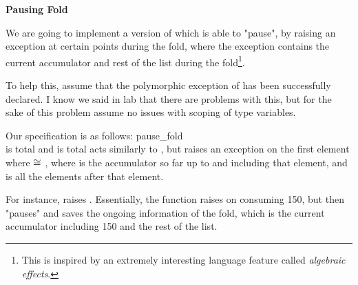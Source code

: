 \documentclass[addpoints,12pt]{exam}
\begin{document}
\begin{questions}

\newpage
{}

\textbf{Pausing Fold}

We are going to implement a version of  which
is able to "pause", by raising an exception at certain points
during the fold, where the exception contains the current accumulator and
rest of the list during the fold\footnote{This is inspired by an extremely
interesting language feature called \textit{algebraic effects}.}.

To help this, assume that the polymorphic exception of
 has been successfully declared.
I know we said in lab that there are problems with this, but for
the sake of this problem assume no issues with scoping of type variables.

Our specification is as follows:
\spec
  {pause_fold}
  {
   \vspace{4pt}
  \\
   {\small {}}}
  { is total and  is total}
  { acts similarly to ,
  but raises an exception  on the first element  where
   $\cong$ , where  is the accumulator so far up to
  and including that element, and  is all the elements after that element.}

For instance,  raises
. Essentially, the function raises on consuming
150, but then "pauses" and saves the ongoing information of the fold,
which is the current accumulator including 150 and the rest of the list.


\end{questions}
\end{document}
